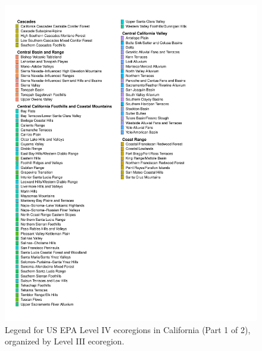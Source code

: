 \documentclass[
  letterpaper,
  DIV=11,
  numbers=noendperiod]{scrartcl}
\begin{document}
\begin{figure}[H]

{\centering \includegraphics[width=1\textwidth,height=\textheight]{01_analyze_files/figure-pdf/legend-L4-page1-1.pdf}

}

\caption{Legend for US EPA Level IV ecoregions in California (Part 1 of
2), organized by Level III ecoregion.}

\end{figure}%

\newpage
\end{document}
